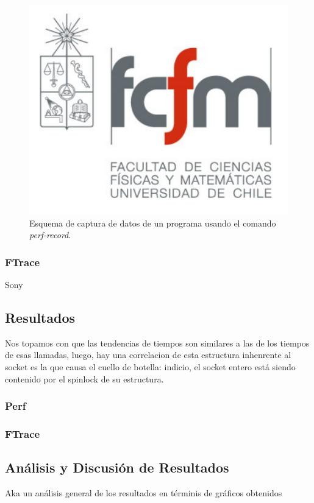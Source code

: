 \begin{figure}[!h]
	\centering
	\includegraphics[scale=.3]{imagenes/fcfm}
	\caption{Esquema de captura de datos de un programa usando el comando \emph{perf-record}.}
	\label{fig:perfRecord}
\end{figure}

\subsubsection{FTrace}
Sony \cite{paper:FTraceSony}


\subsection{Resultados}
Nos topamos con que las tendencias de tiempos son similares a las de los tiempos de esas llamadas, luego, hay una correlacion de esta estructura inhenrente al socket es la que causa el cuello de botella: indicio, el socket entero está siendo contenido por el spinlock de su estructura.

\subsubsection{Perf}
\subsubsection{FTrace}

\subsection{Análisis y Discusión de Resultados}
Aka un análisis general de los resultados en términis de gráficos obtenidos

